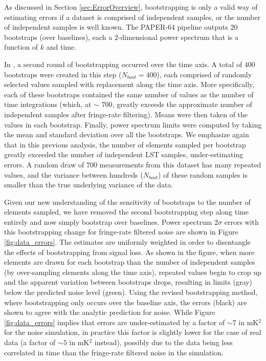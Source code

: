 \documentclass[preprint2,numberedappendix,tighten]{aastex6}  %
\begin{document}
As discussed in Section \ref{sec:ErrorOverview}, bootstrapping is only a valid way of estimating errors if a dataset is comprised 
of independent samples, or the number of independent samples is well known. The PAPER-64 pipeline outputs $20$ bootstraps (over baselines), each a $2$-dimensional power 
spectrum that is a function of $k$ and time. 

In , a second round of bootstrapping occurred over the time axis. A total of $400$ bootstraps were created in this step 
($N_{boot} = 400$), each comprised of randomly selected values sampled with replacement along the time axis. More 
specifically, each of these bootstraps contained the same number of values as the number of time integrations (which, at $\sim$
$700$, greatly exceeds the approximate number of independent samples after fringe-rate filtering).
Means were then taken of the values in each bootstrap. Finally, power 
spectrum limits were computed by taking the mean and standard deviation over all the bootstraps. We emphasize again that in 
this previous analysis, the number of elements sampled per bootstrap greatly 
exceeded the number of independent LST samples, under-estimating errors. A random draw of $700$ 
measurements from this dataset has many repeated values, and the variance between hundreds ($N_{boot}$) of these random 
samples is smaller than the true underlying variance of the data. 

Given our new understanding of the sensitivity of bootstraps to the number of elements sampled, we have removed the second 
bootstrapping step along time entirely and now simply bootstrap over baselines. Power spectrum $2\sigma$ errors with this bootstrapping change for fringe-rate filtered noise are shown in Figure 
\ref{fig:data_errors}. The estimates are uniformly weighted in order to disentangle the effects of bootstrapping from signal loss. As 
shown in the figure, when more elements are drawn for each bootstrap than the number of 
independent samples (by over-sampling elements along the time axis), repeated values begin to crop up and the apparent variation between bootstraps drops, resulting in limits (gray) below the predicted noise level (green). Using the revised bootstrapping method, where bootstrapping only occurs over the baseline axis, the errors (black) are shown to agree with the analytic prediction for noise. While Figure \ref{fig:data_errors} implies that errors are under-estimated by a factor of $\sim$$7$ in mK$^{2}$ for the noise simulation, in practice this factor is slightly lower for the case of real data (a factor of $\sim$$5$ in mK$^{2}$ instead), possibly due to the data being less correlated in time than the fringe-rate filtered noise in the simulation.
\end{document}
